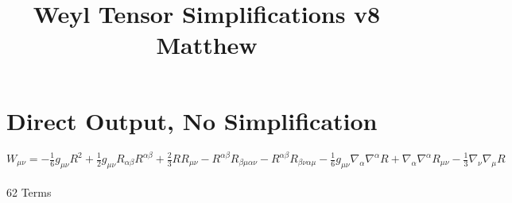 \documentclass[10pt,letterpaper]{article}
\title{Weyl Tensor Simplifications v8 Matthew}
\date{}
\begin{document}
\maketitle
\noindent
\section*{Direct Output, No Simplification}
\begin{equation}
W_{\mu\nu} = - \tfrac{1}{6} g_{\mu \nu} R^2 + \tfrac{1}{2} g_{\mu \nu} R_{\alpha\beta} R^{ \alpha\beta} + \tfrac{2}{3} R R_{\mu \nu} -  R^{\alpha \beta} R_{\beta \mu \alpha \nu} -  R^{\alpha \beta} R_{\beta \nu \alpha \mu} -  \tfrac{1}{6} g_{\mu \nu} \nabla_{\alpha}\nabla^{\alpha}R + \nabla_{\alpha}\nabla^{\alpha}R_{\mu \nu} -  \tfrac{1}{3} \nabla_{\nu}\nabla_{\mu}R\nonumber 
\end{equation}
\\
62 Terms
\end{document}
